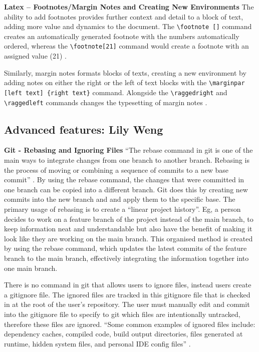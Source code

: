 \documentclass[a4paper, 11pt]{report}
\begin{document}
\textbf{Latex – Footnotes/Margin Notes and Creating New Environments}
The ability to add footnotes provides further context and detail to a block of text, adding more value and dynamics to the document. The \verb|\footnote []| command creates an automatically generated footnote with the numbers automatically ordered, whereas the \verb|\footnote[21]| command would create a footnote with an assigned value (21) \cite{ali8}.

Similarly, margin notes formats blocks of texts, creating a new environment by adding notes on either the right or the left of text blocks with the \verb|\marginpar [left text] {right text}| command. Alongside the \verb|\raggedright| and \verb|\raggedleft| commands changes the typesetting of margin notes \cite{ali9}.


\subsection{Advanced features: Lily Weng}

\textbf{Git - Rebasing and Ignoring Files}
“The rebase command in git is one of the main ways to integrate changes from one branch to another branch. Rebasing is the process of moving or combining a sequence of commits to a new base commit” \cite{l9}. By using the rebase command, the changes that were committed in one branch can be copied into a different branch. Git does this by creating new commits into the new branch and and apply them to the specific base. The primary usage of rebasing is to create a “linear project history”. Eg, a person decides to work on a feature branch of the project instead of the main branch, to keep information neat and understandable but also have the benefit of making it look like they are working on the main branch. This organised method is created by using the rebase command, which updates the latest commits of the feature branch to the main branch, effectively integrating the information together into one main branch.

There is no command in git that allows users to ignore files, instead users create a gitignore file. The ignored files are tracked in this gitignore file that is checked in at the root of the user’s repository. The user must manually edit and commit into the gitignore file to specify to git which files are intentionally untracked, therefore these files are ignored. “Some common examples of ignored files include: dependency caches, compiled code, build output directories, files generated at runtime, hidden system files, and personal IDE config files”  \cite{l11}.
\end{document}
